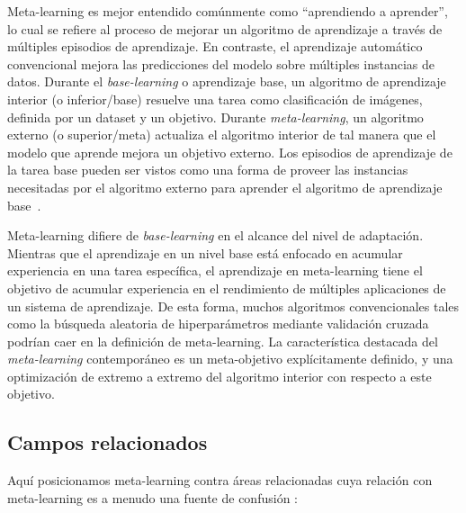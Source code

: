Meta-learning es mejor entendido comúnmente como ``aprendiendo a aprender'', lo cual se refiere al proceso de mejorar un algoritmo de aprendizaje a través de múltiples episodios de aprendizaje. En contraste, el aprendizaje automático convencional mejora las predicciones del modelo sobre múltiples instancias de datos. Durante el \textit{base-learning} o aprendizaje base, un algoritmo de aprendizaje interior (o inferior/base) resuelve una tarea como clasificación de imágenes, definida por un dataset y un objetivo. Durante \emph{meta-learning}, un algoritmo externo (o superior/meta) actualiza el algoritmo interior de tal manera que el modelo que aprende mejora un objetivo externo. Los episodios de aprendizaje de la tarea base pueden ser vistos como una forma de proveer las instancias necesitadas por el algoritmo externo para aprender el algoritmo de aprendizaje base~\cite{hospedales2021metalearning}. 

Meta-learning difiere de \textit{base-learning} en el alcance del nivel de adaptación. Mientras que el aprendizaje en un nivel base está enfocado en acumular experiencia en una tarea específica, el aprendizaje en meta-learning tiene el objetivo de acumular experiencia en el rendimiento de múltiples aplicaciones de un sistema de aprendizaje. De esta forma, muchos algoritmos convencionales tales como la búsqueda aleatoria de hiperparámetros mediante validación cruzada podrían caer en la definición de meta-learning. La característica destacada del \emph{meta-learning} contemporáneo es un meta-objetivo explícitamente definido, y una optimización de extremo a extremo del algoritmo interior con respecto a este objetivo.

\subsection{Campos relacionados}\label{subsec:mtl_related_fields}


Aquí posicionamos meta-learning contra áreas relacionadas cuya relación con meta-learning es a menudo una fuente de confusión \cite{hospedales2021metalearning}:

